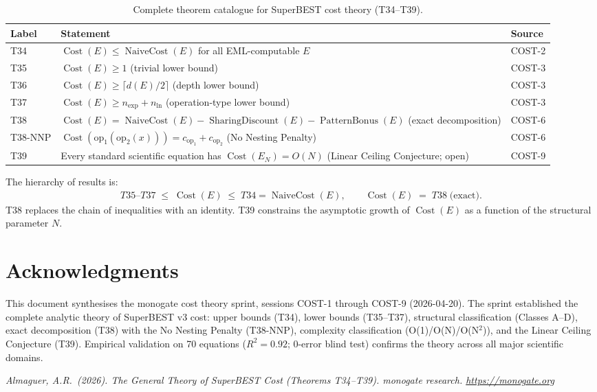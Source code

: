 \documentclass[12pt,a4paper]{article}
\theoremstyle{definition}
\newcommand{\Cost}{\operatorname{Cost}}
\newcommand{\NC}{\operatorname{NaiveCost}}
\newcommand{\SD}{\operatorname{SharingDiscount}}
\newcommand{\PB}{\operatorname{PatternBonus}}
\begin{document}
\begin{table}[h]
\centering
\caption{Complete theorem catalogue for SuperBEST cost theory (T34--T39).}
\label{tab:theorems}
\smallskip
\begin{tabular}{@{}lL{6cm}l@{}}
\toprule
\textbf{Label} & \textbf{Statement} & \textbf{Source} \\
\midrule
T34
  & $\Cost(E) \leq \NC(E)$ for all EML-computable $E$
  & COST-2 \\[4pt]
T35
  & $\Cost(E) \geq 1$ (trivial lower bound)
  & COST-3 \\[4pt]
T36
  & $\Cost(E) \geq \lceil d(E)/2 \rceil$ (depth lower bound)
  & COST-3 \\[4pt]
T37
  & $\Cost(E) \geq n_{\exp} + n_{\ln}$ (operation-type lower bound)
  & COST-3 \\[4pt]
T38
  & $\Cost(E) = \NC(E) - \SD(E) - \PB(E)$ (exact decomposition)
  & COST-6 \\[4pt]
T38-NNP
  & $\Cost(\mathrm{op}_1(\mathrm{op}_2(x))) = c_{\mathrm{op}_1} + c_{\mathrm{op}_2}$
    (No Nesting Penalty)
  & COST-6 \\[4pt]
T39
  & Every standard scientific equation has $\Cost(E_N) = O(N)$
    (Linear Ceiling Conjecture; open)
  & COST-9 \\
\bottomrule
\end{tabular}
\end{table}

The hierarchy of results is:
\begin{align*}
  T35\text{--}T37 \;\leq\; \Cost(E) \;\leq\; T34 = \NC(E),
  \qquad
  \Cost(E) \;=\; T38 \;\text{(exact)}.
\end{align*}
T38 replaces the chain of inequalities with an identity.  T39 constrains the
asymptotic growth of $\Cost(E)$ as a function of the structural parameter $N$.

\section*{Acknowledgments}

This document synthesises the monogate cost theory sprint, sessions COST-1
through COST-9 (2026-04-20).  The sprint established the complete analytic
theory of SuperBEST v3 cost: upper bounds (T34), lower bounds (T35--T37),
structural classification (Classes A--D), exact decomposition (T38) with the
No Nesting Penalty (T38-NNP), complexity classification (O(1)/O(N)/O(N$^2$)),
and the Linear Ceiling Conjecture (T39).  Empirical validation on 70 equations
($R^2 = 0.92$; 0-error blind test) confirms the theory across all major
scientific domains.

\bigskip
\noindent\textit{Almaguer, A.R.\ (2026).
The General Theory of SuperBEST Cost (Theorems T34--T39).
monogate research. \url{https://monogate.org}}
\end{document}

